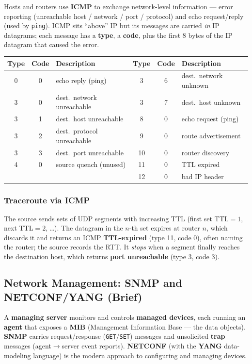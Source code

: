 \documentclass[hidelinks]{article}
\begin{document}
Hosts and routers use \textbf{ICMP} to exchange network-level information ---
error reporting (unreachable host / network / port / protocol) and echo
request/reply (used by \texttt{ping}). ICMP sits ``above'' IP but its messages
are carried \emph{in} IP datagrams; each message has a \textbf{type}, a
\textbf{code}, plus the first 8 bytes of the IP datagram that caused the error.

\renewcommand{\arraystretch}{1.25}
\noindent\begin{tabularx}{\textwidth}{|c|c|X||c|c|X|}
\hline
\textbf{Type} & \textbf{Code} & \textbf{Description} & \textbf{Type} & \textbf{Code} & \textbf{Description} \\
\hline
0 & 0 & echo reply (ping) & 3 & 6 & dest.\ network unknown \\
\hline
3 & 0 & dest.\ network unreachable & 3 & 7 & dest.\ host unknown \\
\hline
3 & 1 & dest.\ host unreachable & 8 & 0 & echo request (ping) \\
\hline
3 & 2 & dest.\ protocol unreachable & 9 & 0 & route advertisement \\
\hline
3 & 3 & dest.\ port unreachable & 10 & 0 & router discovery \\
\hline
4 & 0 & source quench (unused) & 11 & 0 & TTL expired \\
\hline
 & & & 12 & 0 & bad IP header \\
\hline
\end{tabularx}

\subsubsection{Traceroute via ICMP}
The source sends sets of UDP segments with increasing TTL (first set TTL$=1$,
next TTL$=2$, \dots). The datagram in the $n$-th set expires at router $n$,
which discards it and returns an ICMP \textbf{TTL-expired} (type 11, code 0),
often naming the router; the source records the RTT. It \emph{stops} when a
segment finally reaches the destination host, which returns \textbf{port
unreachable} (type 3, code 3).

\subsection{Network Management: SNMP and NETCONF/YANG (Brief)}

A \textbf{managing server} monitors and controls \textbf{managed devices}, each
running an \textbf{agent} that exposes a \textbf{MIB} (Management Information
Base --- the data objects). \textbf{SNMP} carries request/response
(\texttt{GET}/\texttt{SET}) messages and unsolicited \textbf{trap} messages
(agent$\to$server event reports). \textbf{NETCONF} (with the \textbf{YANG}
data-modeling language) is the modern approach to configuring and managing
devices.
\end{document}
